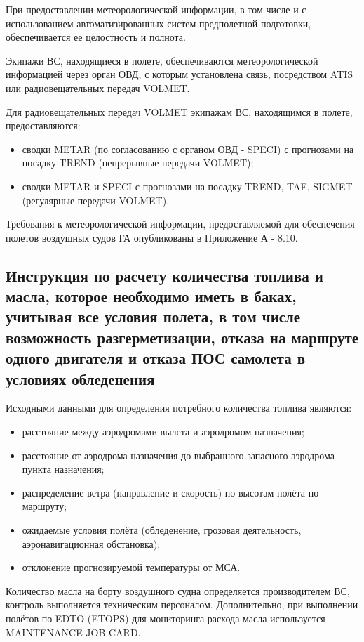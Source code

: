 При предоставлении метеорологической информации, в том числе и с использованием автоматизированных систем предполетной подготовки, обеспечивается ее целостность и полнота. 

Экипажи ВС, находящиеся в полете, обеспечиваются метеорологической информацией через орган ОВД, с которым установлена связь, посредством ATIS или радиовещательных передач VOLMET. 

Для радиовещательных передач VOLMET экипажам ВС, находящимся в полете, предоставляются: 
\begin{itemize}
    \item сводки METAR (по согласованию с органом ОВД - SPECI) с прогнозами на посадку TREND (непрерывные передачи VOLMET);
    \item сводки METAR и SPECI с прогнозами на посадку TREND, TAF, SIGMET (регулярные передачи VOLMET).
\end{itemize}

Требования к метеорологической информации, предоставляемой для обеспечения полетов воздушных судов ГА опубликованы в Приложение А - 8.10.


\subsection{Инструкция по расчету количества топлива и масла, которое необходимо иметь в баках, учитывая все условия полета, в том числе возможность разгерметизации, отказа на маршруте одного двигателя и отказа ПОС самолета в условиях обледенения}

Исходными данными для определения потребного количества топлива являются: 
\begin{itemize}
    \item расстояние между аэродромами вылета и аэродромом назначения;
    \item расстояние от аэродрома назначения до выбранного запасного аэродрома пункта назначения;
    \item распределение ветра (направление и скорость) по высотам полёта по маршруту;
    \item ожидаемые условия полёта (обледенение, грозовая деятельность, аэронавигационная обстановка); 
    \item отклонение прогнозируемой температуры от МСА.
\end{itemize}
	 
Количество масла на борту воздушного судна определяется производителем ВС, контроль выполняется техническим персоналом. Дополнительно, при выполнении полётов по EDTO (ETOPS) для мониторинга расхода масла используется MAINTENANCE JOB CARD.

